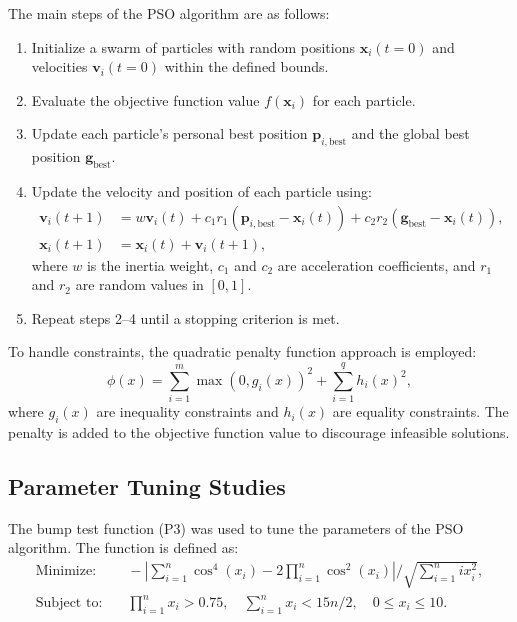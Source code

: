 \documentclass[12pt]{article}
\begin{document}
The main steps of the PSO algorithm are as follows:
\begin{enumerate}
    \item Initialize a swarm of particles with random positions $\mathbf{x}_{i}(t=0)$ and velocities $\mathbf{v}_{i}(t=0)$ within the defined bounds.
    \item Evaluate the objective function value $f(\mathbf{x}_i)$ for each particle.
    \item Update each particle's personal best position $\mathbf{p}_{i,\text{best}}$ and the global best position $\mathbf{g}_{\text{best}}$.
    \item Update the velocity and position of each particle using:
    \begin{align*}
        \mathbf{v}_{i}(t+1) &= w \mathbf{v}_{i}(t) + c_1 r_1 (\mathbf{p}_{i,\text{best}} - \mathbf{x}_{i}(t)) + c_2 r_2 (\mathbf{g}_{\text{best}} - \mathbf{x}_{i}(t)), \\
        \mathbf{x}_{i}(t+1) &= \mathbf{x}_{i}(t) + \mathbf{v}_{i}(t+1),
    \end{align*}
    where $w$ is the inertia weight, $c_1$ and $c_2$ are acceleration coefficients, and $r_1$ and $r_2$ are random values in $[0,1]$.
    \item Repeat steps 2--4 until a stopping criterion is met.
\end{enumerate}

To handle constraints, the quadratic penalty function approach is employed:
\begin{equation*}
    \phi(x) = \sum_{i=1}^{m} \max(0, g_i(x))^2 + \sum_{i=1}^{q} h_i(x)^2,
\end{equation*}
where $g_i(x)$ are inequality constraints and $h_i(x)$ are equality constraints. The penalty is added to the objective function value to discourage infeasible solutions.

\subsection{Parameter Tuning Studies}
The bump test function (P3) was used to tune the parameters of the PSO algorithm. The function is defined as:
\begin{align*}
    \text{Minimize:} & \quad -\left|\sum_{i=1}^{n} \cos^4(x_i) - 2 \prod_{i=1}^{n} \cos^2(x_i) \right| \Big/ \sqrt{\sum_{i=1}^{n} i x_i^2}, \\
    \text{Subject to:} & \quad \prod_{i=1}^{n} x_i > 0.75, \quad \sum_{i=1}^{n} x_i < 15n/2, \quad 0 \leq x_i \leq 10.
\end{align*}
\end{document}
